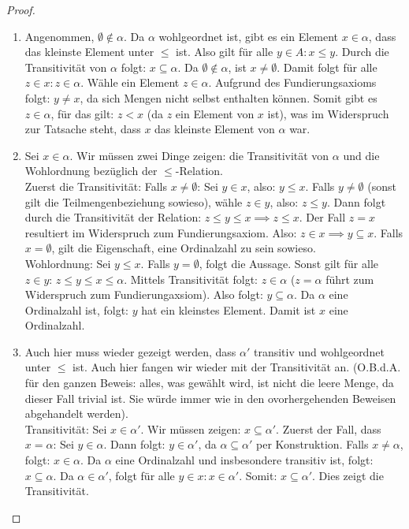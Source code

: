 \documentclass[11pt]{scrartcl}
\begin{document}
\begin{proof}
	\hfill
	\begin{enumerate}
		\item Angenommen, $\emptyset \notin \alpha$. Da $\alpha$ wohlgeordnet ist, gibt es ein Element $x\in\alpha$, dass das kleinste Element unter $\leq$ ist. Also gilt für alle $y\in A: x\leq y$. Durch die Transitivität von $\alpha$ folgt: $ x \subseteq \alpha$. Da $\emptyset\notin \alpha$, ist $x\neq \emptyset$. Damit folgt für alle $z\in x: z\in \alpha$. Wähle ein Element $z\in \alpha$. Aufgrund des Fundierungsaxioms folgt: $y\neq x$, da sich Mengen nicht selbst enthalten können. Somit gibt es $z\in \alpha$, für das gilt: $z < x$ (da $z$ ein Element von $x$ ist), was im Widerspruch zur Tatsache steht, dass $x$ das kleinste Element von $\alpha$ war.
		\item Sei $x\in \alpha$. Wir müssen zwei Dinge zeigen: die Transitivität von $\alpha$ und die Wohlordnung bezüglich der $\leq$-Relation.\\
			Zuerst die Transitivität: Falls $x\neq \emptyset$: Sei $y\in x$, also: $y\leq x$. Falls $y\neq\emptyset$ (sonst gilt die Teilmengenbeziehung sowieso), wähle $z\in y$, also: $z\leq y$. Dann folgt durch die Transitivität der Relation: $z\leq y\leq x \implies z\leq x$. Der Fall $z=x$ resultiert im Widerspruch zum Fundierungsaxiom. Also: $z\in x \implies y\subseteq x$. Falls $x=\emptyset$, gilt die Eigenschaft, eine Ordinalzahl zu sein sowieso. \\
			Wohlordnung: Sei $y\leq x$. Falls $y=\emptyset$, folgt die Aussage. Sonst gilt für alle $z\in y$: $z\leq y\leq x\leq \alpha$. Mittels Transitivität folgt: $z\in\alpha$ ($z=\alpha$ führt zum Widerspruch zum Fundierungaxsiom). Also folgt: $y\subseteq \alpha$. Da $\alpha$ eine Ordinalzahl ist, folgt: $y$ hat ein kleinstes Element. Damit ist $x$ eine Ordinalzahl.
		\item Auch hier muss wieder gezeigt werden, dass $\alpha'$ transitiv und wohlgeordnet unter $\leq$ ist. Auch hier fangen wir wieder mit der Transitivität an. (O.B.d.A. für den ganzen Beweis: alles, was gewählt wird, ist nicht die leere Menge, da dieser Fall trivial ist. Sie würde immer wie in den ovorhergehenden Beweisen abgehandelt werden).\\
			Transitivität: Sei $x\in\alpha'$. Wir müssen zeigen: $ x \subseteq \alpha'$. Zuerst der Fall, dass $x=\alpha$: Sei $y\in \alpha$. Dann folgt: $y\in\alpha'$, da $ \alpha \subseteq \alpha'$ per Konstruktion. Falls $x\neq \alpha$, folgt: $x\in \alpha$. Da $\alpha$ eine Ordinalzahl und insbesondere transitiv ist, folgt: $ x\subseteq \alpha$. Da $\alpha\in \alpha'$, folgt für alle $y\in x: x\in\alpha'$. Somit: $ x \subseteq \alpha'$. Dies zeigt die Transitivität. \\

\end{enumerate}
\end{proof}
\end{document}

